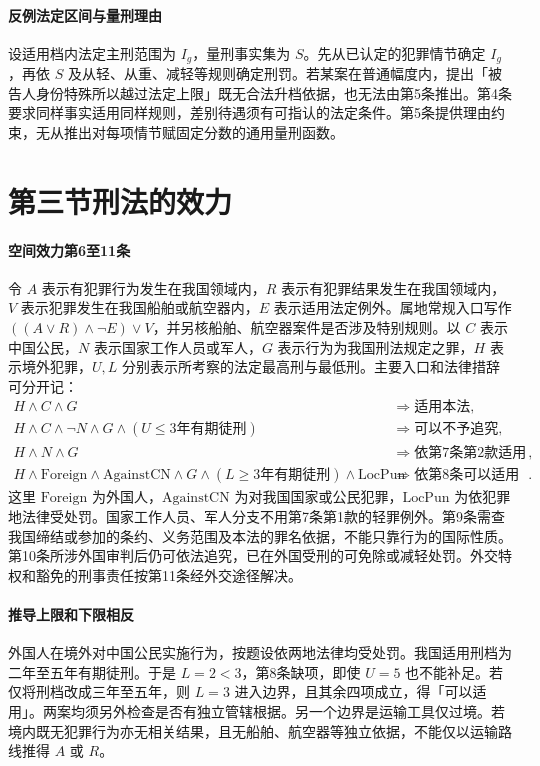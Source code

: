 \paragraph{反例\quad 法定区间与量刑理由}
设适用档内法定主刑范围为 \(I_g\)，量刑事实集为 \(S\)。先从已认定的犯罪情节确定 \(I_g\)，再依 \(S\) 及从轻、从重、减轻等规则确定刑罚。若某案在普通幅度内，提出「被告人身份特殊所以越过法定上限」既无合法升档依据，也无法由第5条推出。第4条要求同样事实适用同样规则，差别待遇须有可指认的法定条件。第5条提供理由约束，无从推出对每项情节赋固定分数的通用量刑函数。

\section{第三节\quad 刑法的效力}

\paragraph{空间效力\quad 第6至11条}
令 \(A\) 表示有犯罪行为发生在我国领域内，\(R\) 表示有犯罪结果发生在我国领域内，\(V\) 表示犯罪发生在我国船舶或航空器内，\(E\) 表示适用法定例外。属地常规入口写作 \(((A\lor R)\land\neg E)\lor V\)，并另核船舶、航空器案件是否涉及特别规则。以 \(C\) 表示中国公民，\(N\) 表示国家工作人员或军人，\(G\) 表示行为为我国刑法规定之罪，\(H\) 表示境外犯罪，\(U,L\) 分别表示所考察的法定最高刑与最低刑。主要入口和法律措辞可分开记：
\begin{align*}
 H\land C\land G
   &\Rightarrow \text{适用本法},\\
 H\land C\land\neg N\land G\land(U\le3\text{年有期徒刑})
   &\Rightarrow \text{可以不予追究},\\
 H\land N\land G
   &\Rightarrow \text{依第7条第2款适用本法},\\
 H\land\mathrm{Foreign}\land\mathrm{AgainstCN}
 \land G\land(L\ge3\text{年有期徒刑})\land\mathrm{LocPun}
   &\Rightarrow \text{依第8条可以适用本法}.
\end{align*}
这里 \(\mathrm{Foreign}\) 为外国人，\(\mathrm{AgainstCN}\) 为对我国国家或公民犯罪，\(\mathrm{LocPun}\) 为依犯罪地法律受处罚。国家工作人员、军人分支不用第7条第1款的轻罪例外。第9条需查我国缔结或参加的条约、义务范围及本法的罪名依据，不能只靠行为的国际性质。第10条所涉外国审判后仍可依法追究，已在外国受刑的可免除或减轻处罚。外交特权和豁免的刑事责任按第11条经外交途径解决。

\paragraph{推导\quad 上限和下限相反}
外国人在境外对中国公民实施行为，按题设依两地法律均受处罚。我国适用刑档为二年至五年有期徒刑。于是 \(L=2<3\)，第8条缺项，即使 \(U=5\) 也不能补足。若仅将刑档改成三年至五年，则 \(L=3\) 进入边界，且其余四项成立，得「可以适用」。两案均须另外检查是否有独立管辖根据。另一个边界是运输工具仅过境。若境内既无犯罪行为亦无相关结果，且无船舶、航空器等独立依据，不能仅以运输路线推得 \(A\) 或 \(R\)。

